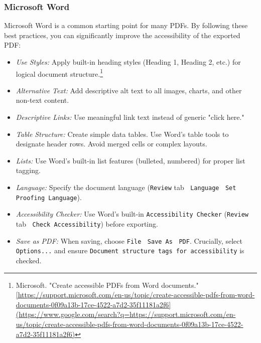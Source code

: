 \begin{itemize}
\subsubsection{Microsoft Word}
\label{subsubsec:word}
Microsoft Word is a common starting point for many PDFs. By following these best practices, you can significantly improve the accessibility of the exported PDF:
\begin{itemize}
\item \emph{Use Styles:} Apply built-in heading styles (Heading 1, Heading 2, etc.) for logical document structure.\footnote{Microsoft. "Create accessible PDFs from Word documents." \url{[https://support.microsoft.com/en-us/topic/create-accessible-pdfs-from-word-documents-0f09a13b-17ce-4522-a7d2-35f11181a2f6](https://www.google.com/search?q=https://support.microsoft.com/en-us/topic/create-accessible-pdfs-from-word-documents-0f09a13b-17ce-4522-a7d2-35f11181a2f6)}}
\item \emph{Alternative Text:} Add descriptive alt text to all images, charts, and other non-text content.
\item \emph{Descriptive Links:} Use meaningful link text instead of generic "click here."
\item \emph{Table Structure:} Create simple data tables. Use Word's table tools to designate header rows. Avoid merged cells or complex layouts.
\item \emph{Lists:} Use Word's built-in list features (bulleted, numbered) for proper list tagging.
\item \emph{Language:} Specify the document language (\texttt{Review} tab $\>$ \texttt{Language} $\>$ \texttt{Set Proofing Language}).
\item \emph{Accessibility Checker:} Use Word's built-in \texttt{Accessibility Checker} (\texttt{Review} tab $\>$ \texttt{Check Accessibility}) before exporting.
\item \emph{Save as PDF:} When saving, choose \texttt{File} $\>$ \texttt{Save As} $\>$ \texttt{PDF}. Crucially, select \texttt{Options...} and ensure \texttt{Document structure tags for accessibility} is checked.
\end{itemize}


\end{itemize}
